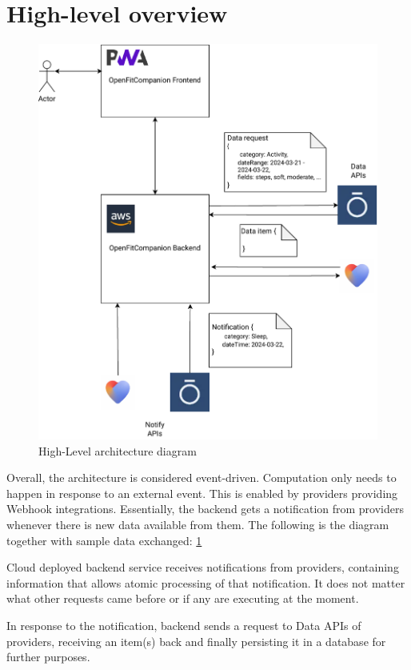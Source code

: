\section{High-level overview}
\begin{figure}
    \centering
    \includegraphics[width=\textwidth,height=\textheight,keepaspectratio]{../images/highLevel.pdf}
    \caption{High-Level architecture diagram}
    \label{fig:1}
\end{figure}
Overall, the architecture is considered event-driven. Computation only needs to happen in response to an external event. This is enabled by providers providing Webhook integrations. Essentially, the backend gets a notification from providers whenever there is new data available from them. The following is the diagram together with sample data exchanged: \ref{fig:1}

Cloud deployed backend service receives notifications from providers, containing information that allows atomic processing of that notification. It does not matter what other requests came before or if any are executing at the moment. 

In response to the notification, backend sends a request to Data APIs of providers, receiving an item(s) back and finally persisting it in a database for further purposes. 

